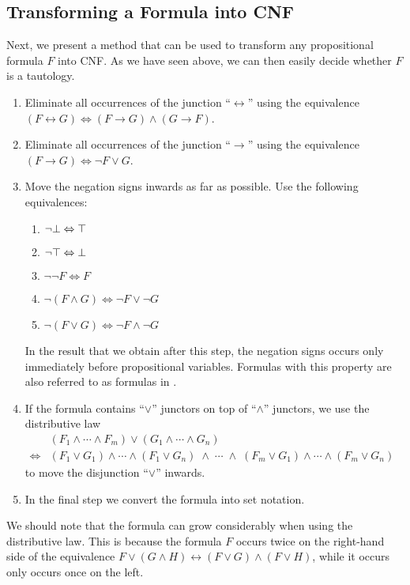 \subsection{Transforming a Formula into CNF}
Next, we present a method that can be used to transform any propositional formula $F$ into CNF.  As we have
seen above, we can then easily decide whether $F$ is a tautology. 
\begin{enumerate}
\item Eliminate all occurrences of the junction ``$\leftrightarrow$'' using the equivalence \\[0.2cm]
      \hspace*{1.3cm} 
      $(F \leftrightarrow G) \Leftrightarrow (F \rightarrow G) \wedge (G \rightarrow F)$.
\item Eliminate all occurrences of the junction ``$\rightarrow$'' using the equivalence \\[0.2cm]
      \hspace*{1.3cm} 
      $(F \rightarrow G) \Leftrightarrow \neg F \vee G$.
\item Move the negation signs inwards as far as possible.  Use the following equivalences:
      \begin{enumerate}
      \item $\neg \bot \Leftrightarrow \top$
      \item $\neg \top \Leftrightarrow \bot$
      \item $\neg \neg F \Leftrightarrow F$
      \item $\neg (F \wedge G) \Leftrightarrow \neg F \vee \neg G$ 
      \item $\neg (F \vee G) \Leftrightarrow \neg F \wedge \neg G$ 
      \end{enumerate}
      In the result that we obtain after this step, the negation signs
      occurs only immediately before propositional variables.  Formulas with this
      property are also referred to as formulas in .
\item If the formula contains ``$\vee$'' junctors on top of ``$\wedge$'' junctors, we use the distributive law \\[0.2cm]
      \hspace*{1.3cm} 
      $
      \begin{array}{cl}
                      & (F_1 \wedge \cdots \wedge F_m) \vee (G_1 \wedge \cdots \wedge G_n) \\[0.2cm]
      \Leftrightarrow & (F_1 \vee G_1) \wedge \cdots \wedge (F_1 \vee G_n) \;\wedge \;\cdots\; \wedge\;
                        (F_m \vee G_1) \wedge \cdots \wedge (F_m \vee G_n)
      \end{array}
      $
      \\[0.2cm]
      to move the disjunction ``$\vee$'' inwards.
\item In the final step we convert the formula into set notation.
\end{enumerate}
We should note that the formula can grow considerably when using the distributive law.
This is because the formula $F$ occurs twice on the right-hand side of the equivalence 
$F \vee (G \wedge H) \leftrightarrow (F \vee G) \wedge (F \vee H)$, while it occurs only occurs once on the left. 

